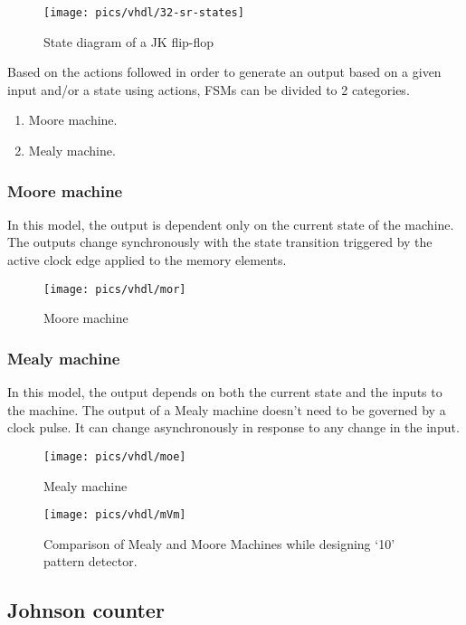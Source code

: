 \begin{figure}[!h]
	\centering
	\texttt{[image: pics/vhdl/32-sr-states]}
	\caption{State diagram of a JK flip-flop}
	\label{fig:32-sr-states}
\end{figure}

\noindent
Based on the actions followed in order to generate an output based on a given input and/or a state using actions, FSMs can be divided to 2 categories.
\begin{enumerate}
	\item Moore machine.
	\item Mealy machine.
\end{enumerate}

\subsubsection{Moore machine}
In this model, the output is dependent only on the current state of the machine. The outputs change synchronously with the state transition triggered by the active clock edge applied to the memory elements.

\begin{figure}[!h]
	\centering
	\texttt{[image: pics/vhdl/mor]}
	\caption{Moore machine}
	\label{fig:mor}
\end{figure}

\subsubsection{Mealy machine}
In this model, the output depends on both the current state and the inputs to the machine. The output of a Mealy machine doesn't need to be governed by a clock pulse. It can change asynchronously in response to any change in the input.

\begin{figure}[!h]
	\centering
	\texttt{[image: pics/vhdl/moe]}
	\caption{Mealy machine}
	\label{fig:moe}
\end{figure}

\begin{figure}[!h]
	\centering
	\texttt{[image: pics/vhdl/mVm]}
	\caption{Comparison of Mealy and Moore Machines while designing ‘10’ pattern detector.}
	\label{fig:mvm}
\end{figure}

\pagebreak

\subsection{Johnson counter}

